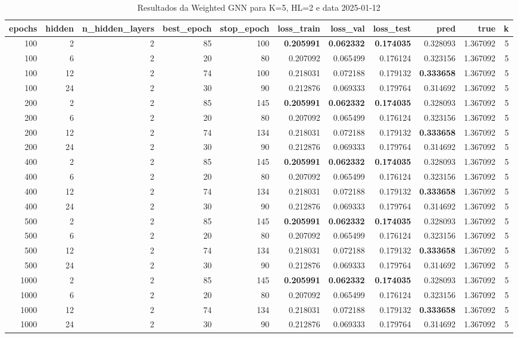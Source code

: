 \begin{table}
\caption{Resultados da Weighted GNN para K=5, HL=2 e data 2025-01-12}
\label{tab:weighted_gnn_results_k5_hl2_d20250112}
\begin{tabular}{rrrrrrrrrrr}
\toprule
epochs & hidden & n\_hidden\_layers & best\_epoch & stop\_epoch & loss\_train & loss\_val & loss\_test & pred & true & k \\
\midrule
100 & 2 & 2 & 85 & 100 & \textbf{0.205991} & \textbf{0.062332} & \textbf{0.174035} & 0.328093 & 1.367092 & 5 \\
100 & 6 & 2 & 20 & 80 & 0.207092 & 0.065499 & 0.176124 & 0.323156 & 1.367092 & 5 \\
100 & 12 & 2 & 74 & 100 & 0.218031 & 0.072188 & 0.179132 & \textbf{0.333658} & 1.367092 & 5 \\
100 & 24 & 2 & 30 & 90 & 0.212876 & 0.069333 & 0.179764 & 0.314692 & 1.367092 & 5 \\
200 & 2 & 2 & 85 & 145 & \textbf{0.205991} & \textbf{0.062332} & \textbf{0.174035} & 0.328093 & 1.367092 & 5 \\
200 & 6 & 2 & 20 & 80 & 0.207092 & 0.065499 & 0.176124 & 0.323156 & 1.367092 & 5 \\
200 & 12 & 2 & 74 & 134 & 0.218031 & 0.072188 & 0.179132 & \textbf{0.333658} & 1.367092 & 5 \\
200 & 24 & 2 & 30 & 90 & 0.212876 & 0.069333 & 0.179764 & 0.314692 & 1.367092 & 5 \\
400 & 2 & 2 & 85 & 145 & \textbf{0.205991} & \textbf{0.062332} & \textbf{0.174035} & 0.328093 & 1.367092 & 5 \\
400 & 6 & 2 & 20 & 80 & 0.207092 & 0.065499 & 0.176124 & 0.323156 & 1.367092 & 5 \\
400 & 12 & 2 & 74 & 134 & 0.218031 & 0.072188 & 0.179132 & \textbf{0.333658} & 1.367092 & 5 \\
400 & 24 & 2 & 30 & 90 & 0.212876 & 0.069333 & 0.179764 & 0.314692 & 1.367092 & 5 \\
500 & 2 & 2 & 85 & 145 & \textbf{0.205991} & \textbf{0.062332} & \textbf{0.174035} & 0.328093 & 1.367092 & 5 \\
500 & 6 & 2 & 20 & 80 & 0.207092 & 0.065499 & 0.176124 & 0.323156 & 1.367092 & 5 \\
500 & 12 & 2 & 74 & 134 & 0.218031 & 0.072188 & 0.179132 & \textbf{0.333658} & 1.367092 & 5 \\
500 & 24 & 2 & 30 & 90 & 0.212876 & 0.069333 & 0.179764 & 0.314692 & 1.367092 & 5 \\
1000 & 2 & 2 & 85 & 145 & \textbf{0.205991} & \textbf{0.062332} & \textbf{0.174035} & 0.328093 & 1.367092 & 5 \\
1000 & 6 & 2 & 20 & 80 & 0.207092 & 0.065499 & 0.176124 & 0.323156 & 1.367092 & 5 \\
1000 & 12 & 2 & 74 & 134 & 0.218031 & 0.072188 & 0.179132 & \textbf{0.333658} & 1.367092 & 5 \\
1000 & 24 & 2 & 30 & 90 & 0.212876 & 0.069333 & 0.179764 & 0.314692 & 1.367092 & 5 \\
\bottomrule
\end{tabular}
\end{table}

